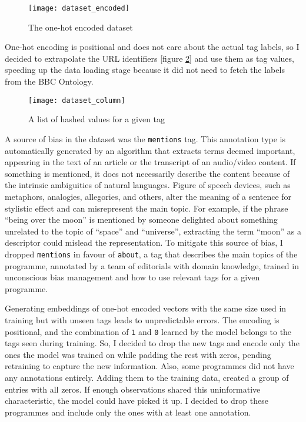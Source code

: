 \begin{figure}[h]
  \centering
  \texttt{[image: dataset\_encoded]}
  \caption{The one-hot encoded dataset}
  \label{fig:dataset_encoded}
\end{figure}

One-hot encoding is positional and does not care about the actual tag labels,
so I decided to extrapolate the URL identifiers [figure \ref{fig:dataset_column}] and use them as tag values,
speeding up the data loading stage because it did not need to fetch the labels from the BBC Ontology.

\begin{figure}[h]
  \centering
  \texttt{[image: dataset\_column]}
  \caption{A list of hashed values for a given tag}
  \label{fig:dataset_column}
\end{figure}


A source of bias in the dataset was the \verb|mentions| tag.
This annotation type is automatically generated by an algorithm that extracts terms deemed important,
appearing in the text of an article or the transcript of an audio/video content.
If something is mentioned, it does not necessarily describe the content because of the intrinsic ambiguities of natural languages.
Figure of speech devices, such as metaphors, analogies, allegories, and others, alter the meaning of a sentence for stylistic effect
and can misrepresent the main topic.
For example, if the phrase ``being over the moon'' is mentioned by someone delighted about something unrelated to the topic of ``space'' and ``universe'',
extracting the term ``moon'' as a descriptor could mislead the representation.
To mitigate this source of bias, I dropped \verb|mentions| in favour of \verb|about|,
a tag that describes the main topics of the programme, annotated by a team of editorials with domain knowledge,
trained in unconscious bias management and how to use relevant tags for a given programme.

Generating embeddings of one-hot encoded vectors with the same size used in training but with
unseen tags leads to unpredictable errors.
The encoding is positional, and the combination of \verb|1| and \verb|0| learned by the model
belongs to the tags seen during training. So, I decided to drop the new tags and encode only the ones the model was trained on
while padding the rest with zeros, pending retraining to capture the new information.
Also, some programmes did not have any annotations entirely. Adding them to the training data, created a group of entries with all zeros.
If enough observations shared this uninformative characteristic, the model could have picked it up.
I decided to drop these programmes and include only the ones with at least one annotation.
